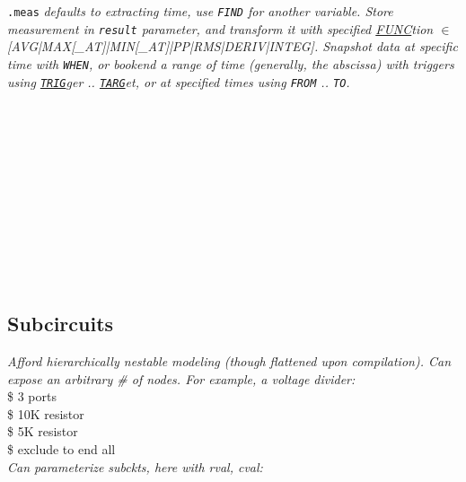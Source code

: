 \texttt{.meas} \textit{ defaults to extracting time, use \texttt{FIND} for another variable. Store measurement in \texttt{result} parameter, and transform it with specified \underline{FUNC}tion $\in$ {\scriptsize [AVG|MAX[\_AT]|MIN[\_AT]|PP|RMS|DERIV|INTEG]}. Snapshot data at specific time with \texttt{WHEN}, or bookend a range of time (generally, the abscissa) with triggers using \texttt{\underline{TRIG}}ger .. \texttt{\underline{TARG}}et, or at specified times using \texttt{FROM} .. \texttt{TO}.}\\
{\scriptsize {}\\
\mycolX{40mm}{\code{\textit{+ [[TRIG|TARG] trig\_var VAL=val [TD=td]? }}} \\
 \\
} \\
{\scriptsize 
{}\\
\\
 \\
 \\
 \\
 \\
 \\
}




\subsection*{Subcircuits}

\textit{Afford hierarchically nestable modeling (though flattened upon compilation). Can expose an arbitrary \# of nodes. For example, a voltage divider:}\\
 \$ 3 ports \\
 \$ 10K resistor \\
 \$ 5K resistor \\
 \$ exclude to end all \\[2mm]
\textit{Can parameterize subckts, here with rval, cval:}\\
 \\


